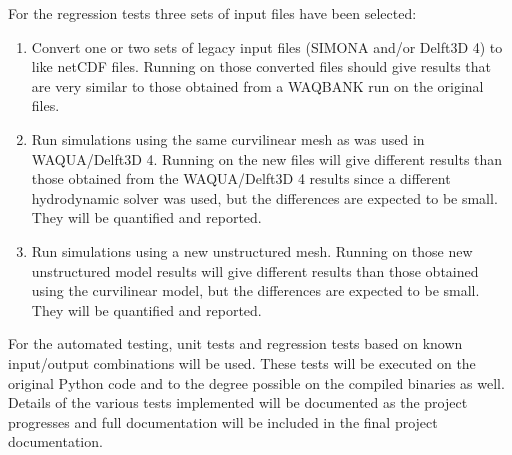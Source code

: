 For the regression tests three sets of input files have been selected:

\begin{enumerate}
\item Convert one or two sets of legacy input files (SIMONA and/or Delft3D 4) to \dflowfm like netCDF files.
Running \dfastbe on those converted files should give results that are very similar to those obtained from a WAQBANK run on the original files.
\item Run \dflowfm simulations using the same curvilinear mesh as was used in WAQUA/Delft3D 4.
Running \dfastbe on the new files will give different results than those obtained from the WAQUA/Delft3D 4 results since a different hydrodynamic solver was used, but the differences are expected to be small.
They will be quantified and reported.
\item Run \dflowfm simulations using a new unstructured mesh.
Running \dfastbe on those new unstructured model results will give different results than those obtained using the curvilinear model, but the differences are expected to be small.
They will be quantified and reported.
\end{enumerate}

For the automated testing, unit tests and regression tests based on known input/output combinations will be used.
These tests will be executed on the original Python code and to the degree possible on the compiled binaries as well.
Details of the various tests implemented will be documented as the project progresses and full documentation will be included in the final project documentation.
